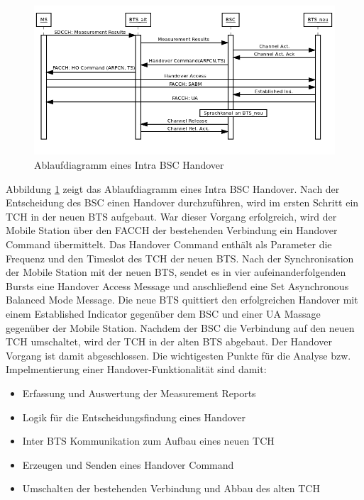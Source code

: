 \begin{figure}[h!]
  \centering
  \includegraphics[width=\textwidth]{img/ablauf_handover}
  \caption{Ablaufdiagramm eines Intra BSC Handover}
  \label{fig:adhandover}
\end{figure}

Abbildung \ref{fig:adhandover} zeigt das Ablaufdiagramm eines Intra BSC Handover. Nach der Entscheidung des BSC einen Handover durchzuführen, wird im ersten Schritt ein TCH in der neuen BTS aufgebaut. War dieser Vorgang erfolgreich, wird der Mobile Station über den FACCH der bestehenden Verbindung ein Handover Command übermittelt. Das Handover Command enthält als Parameter die Frequenz und den Timeslot des TCH der neuen BTS. Nach der Synchronisation der Mobile Station mit der neuen BTS, sendet es in vier aufeinanderfolgenden Bursts eine Handover Access Message und anschließend eine Set Asynchronous Balanced Mode Message. Die neue BTS quittiert den erfolgreichen Handover mit einem Established Indicator gegenüber dem BSC und einer UA Massage gegenüber der Mobile Station. Nachdem der BSC die Verbindung auf den neuen TCH umschaltet, wird der TCH in der alten BTS abgebaut. Der Handover Vorgang ist damit abgeschlossen. Die wichtigesten Punkte für die Analyse bzw. Impelmentierung einer Handover-Funktionalität sind damit:

\begin{itemize}
 \item Erfassung und Auswertung der Measurement Reports
 \item Logik für die Entscheidungsfindung eines Handover
 \item Inter BTS Kommunikation zum Aufbau eines neuen TCH
 \item Erzeugen und Senden eines Handover Command
 \item Umschalten der bestehenden Verbindung und Abbau des alten TCH
\end{itemize}

